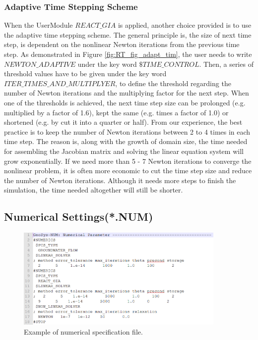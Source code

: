 \subsubsection{Adaptive Time Stepping Scheme}

When the UserModule $REACT\_GIA$ is applied, another choice provided is to use the adaptive time stepping scheme. The general principle is, the size of next time step, is dependent on the nonlinear Newton iterations from the previous time step. As demonstrated in Figure \ref{fig:RT_fig_adapt_tim}, the user needs to write $NEWTON\_ADAPTIVE$ under the key word $\$TIME\_CONTROL$.  Then, a series of threshold values have to be given under the key word $ITER\_TIMES\_AND\_MULTIPLYER$, to define the threshold regarding the number of Newton iterations and the multiplying factor for the next step. When one of the thresholds is achieved, the next time step size can be prolonged (e.g. multiplied by a factor of 1.6), kept the same (e.g. times a factor of 1.0) or shortened (e.g. by cut it into a quarter or half). From our experience, the best practice is to keep the number of Newton iterations between 2 to 4 times in each time step. The reason is, along with the growth of domain size, the time needed for assembling the Jacobian matrix and solving the linear equation system will grow exponentially. If we need more than 5 - 7 Newton iterations to converge the nonlinear problem, it is often more economic to cut the time step size and reduce the number of Newton iterations. Although it needs more steps to finish the simulation, the time needed altogether will still be shorter. 

\subsection{Numerical Settings(*.NUM)}

\begin{figure}
\includegraphics[width=0.9\textwidth]{RT/figs/RT_fig_num_file}
\caption{Example of numerical specification file. }
\label{fig:RT_fig_num_file}
\end{figure}

